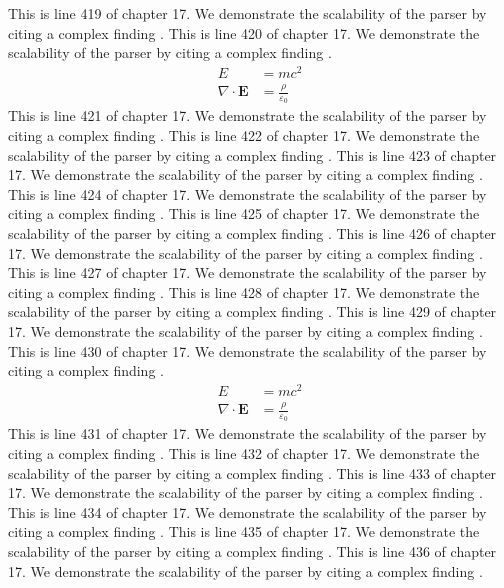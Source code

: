 This is line 419 of chapter 17. We demonstrate the scalability of the parser by citing a complex finding \cite{ref17_419}.
This is line 420 of chapter 17. We demonstrate the scalability of the parser by citing a complex finding \cite{ref17_420}.
\begin{align*}
  E &= mc^2 \\
  \nabla \cdot \mathbf{E} &= \frac{\rho}{\varepsilon_0}
\end{align*}
This is line 421 of chapter 17. We demonstrate the scalability of the parser by citing a complex finding \cite{ref17_421}.
This is line 422 of chapter 17. We demonstrate the scalability of the parser by citing a complex finding \cite{ref17_422}.
This is line 423 of chapter 17. We demonstrate the scalability of the parser by citing a complex finding \cite{ref17_423}.
This is line 424 of chapter 17. We demonstrate the scalability of the parser by citing a complex finding \cite{ref17_424}.
This is line 425 of chapter 17. We demonstrate the scalability of the parser by citing a complex finding \cite{ref17_425}.
This is line 426 of chapter 17. We demonstrate the scalability of the parser by citing a complex finding \cite{ref17_426}.
This is line 427 of chapter 17. We demonstrate the scalability of the parser by citing a complex finding \cite{ref17_427}.
This is line 428 of chapter 17. We demonstrate the scalability of the parser by citing a complex finding \cite{ref17_428}.
This is line 429 of chapter 17. We demonstrate the scalability of the parser by citing a complex finding \cite{ref17_429}.
This is line 430 of chapter 17. We demonstrate the scalability of the parser by citing a complex finding \cite{ref17_430}.
\begin{align*}
  E &= mc^2 \\
  \nabla \cdot \mathbf{E} &= \frac{\rho}{\varepsilon_0}
\end{align*}
This is line 431 of chapter 17. We demonstrate the scalability of the parser by citing a complex finding \cite{ref17_431}.
This is line 432 of chapter 17. We demonstrate the scalability of the parser by citing a complex finding \cite{ref17_432}.
This is line 433 of chapter 17. We demonstrate the scalability of the parser by citing a complex finding \cite{ref17_433}.
This is line 434 of chapter 17. We demonstrate the scalability of the parser by citing a complex finding \cite{ref17_434}.
This is line 435 of chapter 17. We demonstrate the scalability of the parser by citing a complex finding \cite{ref17_435}.
This is line 436 of chapter 17. We demonstrate the scalability of the parser by citing a complex finding \cite{ref17_436}.
